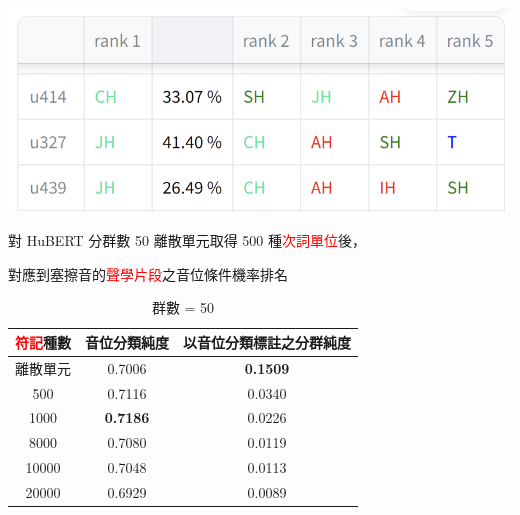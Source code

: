     {
        \begin{table}
            \centering
            \includegraphics[width=0.8\linewidth]{figures/ch4figs/aff-hub50-500.png}
            \caption{對 HuBERT 分群數 50 離散單元取得 500 種\textcolor{red}{次詞單位}後，}
            對應到塞擦音的\textcolor{red}{聲學片段}之音位條件機率排名
            \label{fig:aff}
        \end{table}

        \begin{table}[!htbp]
            \centering

            \begin{subtable}[t]{\textwidth}
                \centering
                \begin{tabular}{|c|c|c|} \hline
                    \textcolor{red}{符記}種數  & 音位分類純度    & 以音位分類標註之分群純度    \\ \hline
                    離散單元  &         0.7006  &            \textbf{0.1509}  \\ \hline
                        500   &         0.7116  &                    0.0340   \\ \hline
                       1000   & \textbf{0.7186} &                    0.0226   \\ \hline
                       8000   &         0.7080  &                    0.0119   \\ \hline
                      10000   &         0.7048  &                    0.0113   \\ \hline
                      20000   &         0.6929  &                    0.0089   \\ \hline
                \end{tabular}
                \caption{群數 = 50}
                \label{tab:ch4-new-hubert-pcls-clu050}
            \end{subtable}

            \vfill


\end{table}}
